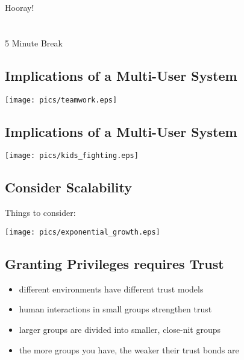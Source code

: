 \documentclass[xga]{xdvislides}
\begin{document}
\newpage
\vspace*{\fill}
\begin{center}
    \Hugesize
        Hooray! \\ [1em]
    \hspace*{5mm}
    \blueline\\
    \hspace*{5mm}\\
        5 Minute Break
\end{center}
\vspace*{\fill}

\subsection{Implications of a Multi-User System}
\vspace*{\fill}
\begin{center}
	\texttt{[image: pics/teamwork.eps]}
\end{center}
\vspace*{\fill}

\subsection{Implications of a Multi-User System}
\vspace*{\fill}
\begin{center}
	\texttt{[image: pics/kids\_fighting.eps]}
\end{center}
\vspace*{\fill}

\subsection{Consider Scalability}
Things to consider:
\\

\begin{center}
	\texttt{[image: pics/exponential\_growth.eps]}
\end{center}


\subsection{Granting Privileges requires Trust}
\begin{itemize}
	\item different environments have different trust models
	\item human interactions in small groups strengthen trust
	\item larger groups are divided into smaller, close-nit groups
	\item the more groups you have, the weaker their trust bonds are
\end{itemize}
\end{document}
